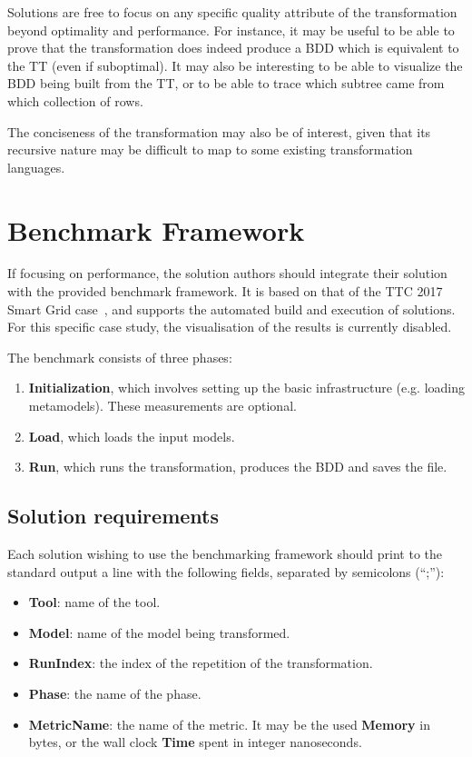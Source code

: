 \documentclass[a4paper]{scrartcl}
\begin{document}
Solutions are free to focus on any specific quality attribute of the
transformation beyond optimality and performance. For instance, it may be useful
to be able to prove that the transformation does indeed produce a BDD which is
equivalent to the TT (even if suboptimal). It may also be interesting to be able
to visualize the BDD being built from the TT, or to be able to trace which
subtree came from which collection of rows.

The conciseness of the transformation may also be of interest, given that its
recursive nature may be difficult to map to some existing transformation
languages.

\section{Benchmark Framework}
\label{sec:benchmark-framework}

If focusing on performance, the solution authors should integrate their solution
with the provided benchmark framework. It is based on that of the TTC 2017 Smart
Grid case~\cite{hinkel_ttc_2017}, and supports the automated build and execution
of solutions. For this specific case study, the visualisation of the results is
currently disabled.

The benchmark consists of three phases:

\begin{enumerate}
\item \textbf{Initialization}, which involves setting up the basic
  infrastructure (e.g. loading metamodels). These measurements are optional.
\item \textbf{Load}, which loads the input models.
\item \textbf{Run}, which runs the transformation, produces the BDD and saves
  the file.
\end{enumerate}

\subsection{Solution requirements}
\label{sec:solut-requ}

Each solution wishing to use the benchmarking framework should print to the
standard output a line with the following fields, separated by semicolons
(``;''):

\begin{itemize}
\item \textbf{Tool}: name of the tool.
\item \textbf{Model}: name of the model being transformed.
\item \textbf{RunIndex}: the index of the repetition of the transformation.
\item \textbf{Phase}: the name of the phase.
\item \textbf{MetricName}: the name of the metric. It may be the used
  \textbf{Memory} in bytes, or the wall clock \textbf{Time} spent in integer
  nanoseconds.
\end{itemize}
\end{document}
